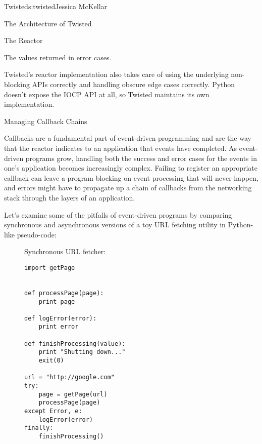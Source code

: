 \begin{aosachapter}{Twisted}{s:twisted}{Jessica McKellar}
\begin{aosasect1}{The Architecture of Twisted}
\begin{aosasect2}{The Reactor}
\begin{aosaitemize}
\item The values returned in error cases.

\end{aosaitemize}

Twisted's reactor implementation also takes care of using the underlying
non-blocking APIs correctly and handling obscure edge cases correctly. Python
doesn't expose the IOCP API at all, so Twisted maintains its own
implementation.

\end{aosasect2}

\begin{aosasect2}{Managing Callback Chains}

Callbacks are a fundamental part of event-driven programming and are the way
that the reactor indicates to an application that events have completed. As
event-driven programs grow, handling both the success and error cases for the
events in one's application becomes increasingly complex. Failing to register an
appropriate callback can leave a program blocking on event processing that will
never happen, and errors might have to propagate up a chain of callbacks from
the networking stack through the layers of an application.

Let's examine some of the pitfalls of event-driven programs by comparing
synchronous and asynchronous versions of a toy URL fetching utility in
Python-like pseudo-code:

\begin{figure}[h!]
\centering
\begin{minipage}[t]{0.4\linewidth}

Synchronous URL fetcher:

\centering
\begin{verbatim}
import getPage


def processPage(page):
    print page

def logError(error):
    print error

def finishProcessing(value):
    print "Shutting down..."
    exit(0)

url = "http://google.com"
try:
    page = getPage(url)
    processPage(page)
except Error, e:
    logError(error)
finally:
    finishProcessing()
\end{verbatim}

\end{minipage}
\hspace{0.01cm}
\begin{minipage}[t]{0.4\linewidth}


\end{minipage}
\end{figure}
\end{aosasect2}
\end{aosasect1}
\end{aosachapter}
